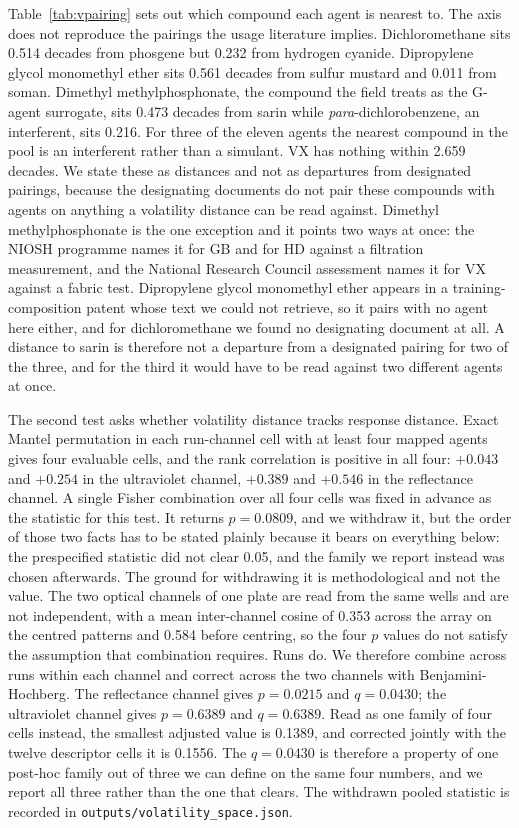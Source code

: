 \documentclass[journal=jacsat,manuscript=suppinfo,margin=1in]{achemso}
\begin{document}
Table~\ref{tab:vpairing} sets out which compound each agent is nearest to. The
axis does not reproduce the pairings the usage literature implies.
Dichloromethane sits 0.514 decades from phosgene but 0.232 from hydrogen
cyanide. Dipropylene glycol monomethyl ether sits 0.561 decades from sulfur
mustard and 0.011 from soman. Dimethyl methylphosphonate, the compound the
field treats as the G-agent surrogate, sits 0.473 decades from sarin while
\textit{para}-dichlorobenzene, an interferent, sits 0.216. For three of the
eleven agents the nearest compound in the pool is an interferent rather than a
simulant. VX has nothing within 2.659 decades. We state these as distances and
not as departures from designated pairings, because the designating documents do not
pair these compounds with agents on anything a volatility distance can be
read against. Dimethyl methylphosphonate is the one exception and it points
two ways at once: the NIOSH programme names it for GB and for HD against a
filtration measurement, and the National Research Council assessment
names it for VX against a fabric test. Dipropylene glycol monomethyl ether appears in a
training-composition patent whose text we could not retrieve, so it pairs with
no agent here either, and for dichloromethane we found no designating document
at all. A distance to sarin is therefore not a departure from a designated
pairing for two of the three, and for the third it would have to be read
against two different agents at once.

The second test asks whether volatility distance tracks response distance.
Exact Mantel permutation in each run-channel cell with at least four mapped
agents gives four evaluable cells, and the rank correlation is positive in all
four: $+0.043$ and $+0.254$ in the ultraviolet channel, $+0.389$ and $+0.546$
in the reflectance channel. A single Fisher combination over all four cells was
fixed in advance as the statistic for this test. It returns $p = 0.0809$, and
we withdraw it, but the order of those two facts has to be stated plainly
because it bears on everything below: the prespecified statistic did not clear
0.05, and the family we report instead was chosen afterwards. The ground for
withdrawing it is methodological and not the value. The two optical channels of
one plate are read from the same wells and are not independent, with a mean
inter-channel cosine of 0.353 across the array on the centred patterns and
0.584 before centring, so the four $p$ values do not
satisfy the assumption that combination requires. Runs do. We therefore combine
across runs within each channel and correct across the two channels with
Benjamini-Hochberg. The reflectance channel gives $p = 0.0215$ and
$q = 0.0430$; the ultraviolet channel gives $p = 0.6389$ and $q = 0.6389$.
Read as one family of four cells instead, the smallest adjusted value is
0.1389, and corrected jointly with the twelve descriptor cells it is 0.1556.
The $q = 0.0430$ is therefore a property of one post-hoc family out of three we
can define on the same four numbers, and we report all three rather than the
one that clears. The withdrawn pooled statistic is recorded in
\texttt{outputs/volatility\_space.json}.
\end{document}
